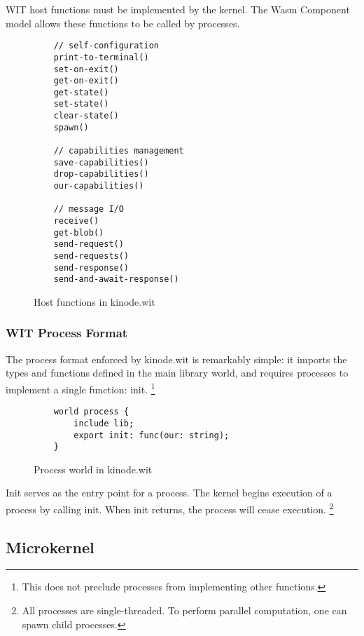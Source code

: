 \documentclass[runningheads]{llncs}
\begin{document}
WIT host functions must be implemented by the kernel.
The Wasm Component model allows these functions to be called by processes.

\begin{figure}
    \centering
    \begin{lstlisting}
    // self-configuration
    print-to-terminal()
    set-on-exit()
    get-on-exit()
    get-state()
    set-state()
    clear-state()
    spawn()

    // capabilities management
    save-capabilities()
    drop-capabilities()
    our-capabilities()

    // message I/O
    receive()
    get-blob()
    send-request()
    send-requests()
    send-response()
    send-and-await-response()
    \end{lstlisting}
    \caption{Host functions in kinode.wit}
    \label{fig:WIT Functions}
\end{figure}

\subsubsection{WIT Process Format}

The process format enforced by kinode.wit is remarkably simple: it imports the types and functions defined in the main library world, and requires processes to implement a single function: init.
\footnote{This does not preclude processes from implementing other functions.}

\begin{figure}
    \centering
    \begin{lstlisting}
    world process {
        include lib;
        export init: func(our: string);
    }
    \end{lstlisting}
    \caption{Process world in kinode.wit}
    \label{fig:Process world}
\end{figure}

Init serves as the entry point for a process.
The kernel begins execution of a process by calling init.
When init returns, the process will cease execution.
\footnote{All processes are single-threaded. To perform parallel computation, one can spawn child processes.}

\subsection{Microkernel}
\end{document}
